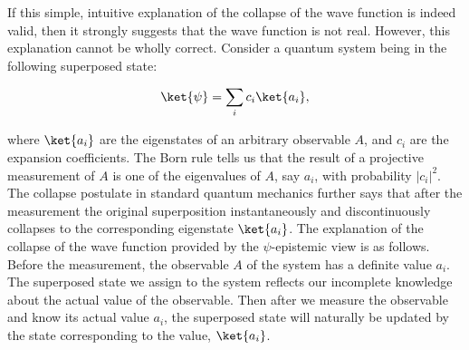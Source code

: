 If this simple, intuitive explanation of the collapse of the wave function is indeed valid, then it strongly suggests that the wave function is not real. However, this explanation cannot be wholly correct. Consider a quantum system being in the following superposed state:

\begin{equation}
\ket{\psi} = \sum_{i} {c_i \ket{a_i}},
\end{equation}

\noindent where $\ket{a_i}$ are the eigenstates of an arbitrary observable $A$, and $c_i$ are the expansion coefficients.
The Born rule tells us that the result of a projective measurement of $A$ is one of the eigenvalues of $A$, say $a_i$, with probability $|c_i|^2$.
The collapse postulate in standard quantum mechanics further says that after the measurement the original superposition instantaneously and discontinuously collapses to the corresponding eigenstate $\ket{a_i}$.
The explanation of the collapse of the wave function provided by the $\psi$-epistemic view is as follows.
Before  the measurement, the observable $A$ of the system has a definite value $a_i$. The superposed state we assign to the system reflects our incomplete knowledge about the actual value of the observable.
Then after we measure the observable and know its actual value $a_i$, the superposed state will naturally be updated by the state corresponding to the value, $\ket{a_i}$. 


